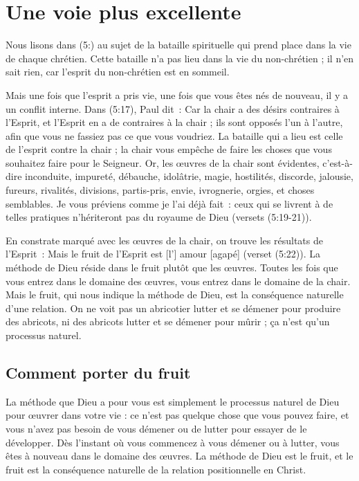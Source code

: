 \chapter{Une voie plus excellente}

Nous lisons dans (5:) au sujet de la bataille spirituelle
 qui prend place dans la vie de chaque chrétien.
 Cette bataille n'a pas lieu dans la vie du non-chrétien ;
 il n'en sait rien, car l'esprit du non-chrétien est en sommeil.

Mais une fois que l'esprit a pris vie, une fois que vous êtes nés de nouveau,
 il y a un conflit interne. Dans (5:17), Paul dit~:
 \og Car la chair a des désirs contraires à l'Esprit,
 et l'Esprit en a de contraires à la chair ; ils sont opposés l'un à l'autre,
 afin que vous ne fassiez pas ce que vous voudriez. \fg{}
 La bataille qui a lieu est celle de l'esprit contre la chair ;
 la chair vous empêche de faire les choses que vous souhaitez
 faire pour le Seigneur.
 \og Or, les œuvres de la chair sont évidentes, c'est-à-dire inconduite,
 impureté, débauche, idolâtrie, magie, hostilités, discorde, jalousie,
 fureurs, rivalités, divisions, partis-pris, envie, ivrognerie, orgies,
 et choses semblables. Je vous préviens comme je l'ai déjà fait~:
 ceux qui se livrent à de telles pratiques n'hériteront pas
 du royaume de Dieu \fg{} (versets (5:19-21)).

En constrate marqué avec les œuvres de la chair, on trouve les résultats
 de l'Esprit~: \og Mais le fruit de l'Esprit est [l'] amour [agapé] \fg{}
 (verset (5:22)). La méthode de Dieu réside dans le fruit
 plutôt que les œuvres. Toutes les fois que vous entrez dans le domaine
 des œuvres, vous entrez dans le domaine de la chair.
 Mais le fruit, qui nous indique la méthode de Dieu, est la conséquence
 naturelle d'une relation. On ne voit pas un abricotier lutter
 et se démener pour produire des abricots, ni des abricots lutter
 et se démener pour mûrir ; ça n'est qu'un processus naturel.


\section*{Comment porter du fruit}

La méthode que Dieu a pour vous est simplement le processus naturel
 de Dieu pour œuvrer dans votre vie : ce n'est pas quelque chose
 que vous pouvez faire, et vous n'avez pas besoin de vous démener
 ou de lutter pour essayer de le développer.
 Dès l'instant où vous commencez à vous démener ou à lutter,
 vous êtes à nouveau dans le domaine des œuvres.
 La méthode de Dieu est le fruit, et le fruit est la conséquence
 naturelle de la relation positionnelle en Christ.


